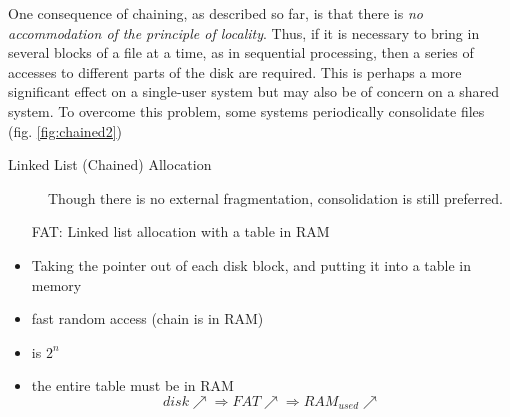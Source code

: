 One consequence of chaining, as described so far, is that there is \emph{no accommodation
  of the principle of locality}. Thus, if it is necessary to bring in several blocks of a
file at a time, as in sequential processing, then a series of accesses to different parts
of the disk are required. This is perhaps a more significant effect on a single-user
system but may also be of concern on a shared system. To overcome this problem, some
systems periodically consolidate files (fig.  \ref{fig:chained2})

\begin{frame}
  \begin{description}
  \item[Linked List (Chained) Allocation] Though there is no external fragmentation,
    consolidation is still preferred.
  \end{description}
  \begin{center}
     
  \end{center}
\end{frame}

\begin{frame}
  \begin{itemize}
  \item[FAT:] Linked list allocation with a table in RAM
  \end{itemize}
  \begin{varwidth}{.59\textwidth}
    \begin{block}{}
      \begin{itemize}
      \item Taking the pointer out of each disk block, and putting it into a table in
        memory
      \item fast random access (chain is in RAM)
      \item is $2^n$
      \item the entire table must be in RAM
        $$disk\nearrow{}\Rightarrow FAT\nearrow{}\Rightarrow RAM_{used}\nearrow$$
      \end{itemize}
    \end{block}
  \end{varwidth}\hfill
  \begin{varwidth}{.39\textwidth}
    \begin{center}
       
    \end{center}
  \end{varwidth}
\end{frame}

